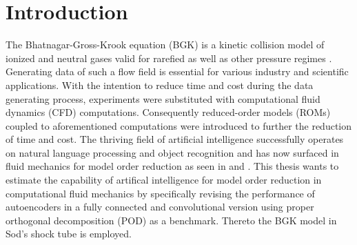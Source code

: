 
\chapter{Introduction}
\label{CH:intro}


The Bhatnagar-Gross-Krook equation (BGK) is a kinetic collision model of ionized and neutral gases valid for rarefied as well as other pressure regimes \cite{BGK}. Generating data of such a flow field is essential for various industry and scientific applications\cite{rarefiedGDapplc}. With the intention to reduce time and cost during the data generating process, experiments were substituted with computational fluid dynamics (CFD) computations. Consequently reduced-order models (ROMs) coupled to aforementioned computations were introduced to further the reduction of time and cost. The thriving field of artificial intelligence successfully operates on natural language processing and object recognition and has now surfaced in fluid mechanics for model order reduction as seen in \cite{Carlberg} and \cite{bukka2020assessment}. This thesis wants to estimate the capability of artifical intelligence for model order reduction in computational fluid mechanics by specifically revising the performance of autoencoders in a fully connected and convolutional version using proper orthogonal decomposition (POD) as a benchmark. Thereto the BGK model in Sod's shock tube is employed. \\

